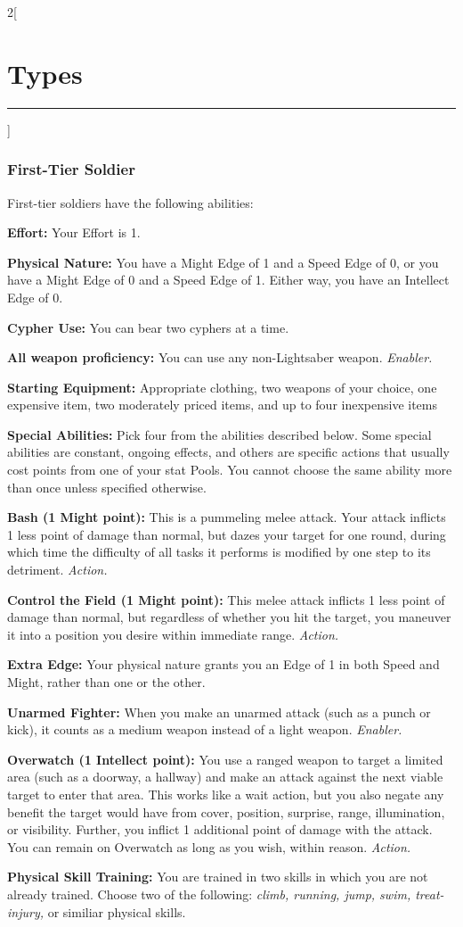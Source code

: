 \documentclass[a4paper,10pt,final]{book}
\newcommand{\HRule}{\rule{\linewidth}{0.5mm}} %
\newcommand{\newSection}[1]{\section*{#1} \addcontentsline{toc}{section}{#1} \label{sec:#1} \HRule}
\newcommand{\itemLine}[2]{\textbf{#1:} {#2}\par}
\newcommand{\itemAbility}[2]{\textcolor{25gray}{\textbullet\textbf{ #1:}} {#2}\par}
\newcommand{\enabler}{\textit{ Enabler.}}
\newcommand{\action}{\textit{ Action.}}
\newenvironment{docsection}[1]
{
  \begin{multicols*}{2}[\newSection{#1}]
}
{
  \end{multicols*}
  \newpage
}
\begin{document}
\begin{docsection}{Types}
\subsubsection*{First-Tier Soldier}
\label{subsub:soldierFirstTier}
First-tier soldiers have the following abilities: \par
\itemLine{Effort} {Your Effort is 1.} 
\itemLine{Physical Nature} {You have a Might Edge
of 1 and a Speed Edge of 0, or you have a
Might Edge of 0 and a Speed Edge of 1.
Either way, you have an Intellect Edge of 0.}
\itemLine{Cypher Use} {You can bear two cyphers at a time.}
\itemLine{All weapon proficiency} {You can use any non-Lightsaber weapon.\enabler}
\itemLine{Starting Equipment} {Appropriate clothing, two weapons of your choice, one expensive item, two moderately priced items, and up to four inexpensive items}
\itemLine{Special Abilities} {Pick four from the abilities described below. Some
special abilities are constant, ongoing effects, and
others are specific actions that usually cost points
from one of your stat Pools. You cannot choose the same ability more than once unless specified otherwise.}
\itemAbility{Bash (1 Might point)} {This is a pummeling
melee attack. Your attack inflicts 1 less point
of damage than normal, but dazes your
target for one round, during which time the
difficulty of all tasks it performs is modified
by one step to its detriment.\action}
\itemAbility{Control the Field (1 Might point)} {This
melee attack inflicts 1 less point of damage
than normal, but regardless of whether
you hit the target, you maneuver it into a
position you desire within immediate range.\action}
\itemAbility{Extra Edge} {Your physical nature grants
you an Edge of 1 in both Speed and Might,
rather than one or the other.}
\itemAbility{Unarmed Fighter} {When you make
an unarmed attack (such as a punch or
kick), it counts as a medium weapon
instead of a light weapon.\enabler}
\itemAbility{Overwatch (1 Intellect point)} {You use
a ranged weapon to target a limited area
(such as a doorway, a hallway) and make an attack
against the next viable target to enter that
area. This works like a wait action, but you
also negate any benefit the target would
have from cover, position, surprise, range,
illumination, or visibility. Further, you inflict
1 additional point of damage with the attack.
You can remain on Overwatch as long as you
wish, within reason.\action}
\itemAbility{Physical Skill Training}{You are trained in two
skills in which you are not already trained.
Choose two of the following: \textit{climb, running, jump, swim, treat-injury,} or similiar physical skills.
}
\end{docsection}
\end{document}
